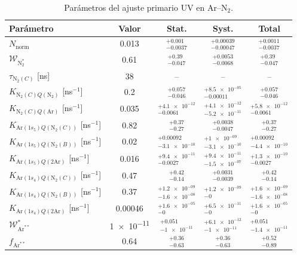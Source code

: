 \begin{table}[htbp]
\centering
\caption{Parámetros del ajuste primario UV en Ar--N$_2$.}
\label{tab:ArN2_primary_stat_syst}
\begin{tabular}{lcccc}
\toprule
Parámetro & Valor & Stat. & Syst. & Total \\
\midrule
$N_{\mathrm{norm}}$ & \num{0.013} & $^{+\num{0.001}}_{-\num{0.0037}}$ & $^{+\num{0.00039}}_{-\num{0.00047}}$ & $^{+\num{0.0011}}_{-\num{0.0037}}$ \\
$\mathcal{W}_{\mathrm{N}_2^*}$ & \num{0.61} & $^{+\num{0.39}}_{-\num{0.047}}$ & $^{+\num{0.0053}}_{-\num{0.0068}}$ & $^{+\num{0.39}}_{-\num{0.047}}$ \\
$\tau_{\mathrm{N}_2(C)}$ [ns] & \num{38} & -- & -- & -- \\
$K_{\mathrm{N}_2(C)Q(\mathrm{N}_2)}$ [ns$^{-1}$] & \num{0.2} & $^{+\num{0.057}}_{-\num{0.046}}$ & $^{+\num{8.5e-05}}_{-\num{0.00011}}$ & $^{+\num{0.057}}_{-\num{0.046}}$ \\
$K_{\mathrm{N}_2(C)Q(\mathrm{Ar})}$ [ns$^{-1}$] & \num{0.035} & $^{+\num{4.1e-12}}_{-\num{0.0061}}$ & $^{+\num{4.1e-12}}_{-\num{5.2e-11}}$ & $^{+\num{5.8e-12}}_{-\num{0.0061}}$ \\
$K_{\mathrm{Ar}(1s_5)Q(\mathrm{N}_2(C))}$ [ns$^{-1}$] & \num{0.82} & $^{+\num{0.37}}_{-\num{0.27}}$ & $^{+\num{0.0038}}_{-\num{0.0047}}$ & $^{+\num{0.37}}_{-\num{0.27}}$ \\
$K_{\mathrm{Ar}(1s_5)Q(\mathrm{N}_2(B))}$ [ns$^{-1}$] & \num{0.02} & $^{+\num{0.00092}}_{-\num{3.1e-10}}$ & $^{+\num{1e-09}}_{-\num{3.1e-10}}$ & $^{+\num{0.00092}}_{-\num{4.4e-10}}$ \\
$K_{\mathrm{Ar}(1s_5)Q(2\mathrm{Ar})}$ [ns$^{-1}$] & \num{0.016} & $^{+\num{9.4e-11}}_{-\num{0.0027}}$ & $^{+\num{9.4e-11}}_{-\num{1.5e-07}}$ & $^{+\num{1.3e-10}}_{-\num{0.0027}}$ \\
$K_{\mathrm{Ar}(1s_4)Q(\mathrm{N}_2(C))}$ [ns$^{-1}$] & \num{0.47} & $^{+\num{0.42}}_{-\num{0.14}}$ & $^{+\num{0.0031}}_{-\num{0.0039}}$ & $^{+\num{0.42}}_{-\num{0.14}}$ \\
$K_{\mathrm{Ar}(1s_4)Q(\mathrm{N}_2(B))}$ [ns$^{-1}$] & \num{0.37} & $^{+\num{1.2e-09}}_{-\num{1.6e-08}}$ & $^{+\num{1.2e-09}}_{-\num{0}}$ & $^{+\num{1.6e-09}}_{-\num{1.6e-08}}$ \\
$K_{\mathrm{Ar}(1s_4)Q(2\mathrm{Ar})}$ [ns$^{-1}$] & \num{0.00046} & $^{+\num{1.6e-05}}_{-\num{0}}$ & $^{+\num{6.5e-11}}_{-\num{0}}$ & $^{+\num{1.6e-05}}_{-\num{0}}$ \\
$\mathcal{W}_{\mathrm{Ar}^{**}}^*$ & \num{1e-11} & $^{+\num{0.051}}_{-\num{1e-11}}$ & $^{+\num{6.1e-12}}_{-\num{1e-11}}$ & $^{+\num{0.051}}_{-\num{1.4e-11}}$ \\
$f_{\mathrm{Ar}^{**}}$ & \num{0.64} & $^{+\num{0.36}}_{-\num{0.63}}$ & $^{+\num{0.36}}_{-\num{0.63}}$ & $^{+\num{0.52}}_{-\num{0.89}}$ \\
\bottomrule
\end{tabular}
\end{table}
